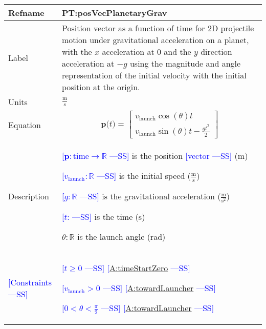 \documentclass[12pt]{article}
\newcommand{\authornote}[3]{\textcolor{#1}{[#3 ---#2]}}
\newcommand{\authornote}[3]{}
\newcommand{\wss}[1]{\authornote{blue}{SS}{#1}}
\begin{document}
\noindent \begin{minipage}{\textwidth}
\begin{tabular}{>{\raggedright}p{}>{\raggedright\arraybackslash}p{}}
\toprule \textbf{Refname} & \textbf{PT:posVecPlanetaryGrav} 
\label{PT:posVecPlanetaryGrav} \\ \midrule Label & Position vector as a function
of time for 2D projectile motion under gravitational acceleration on a planet,
with the $x$ acceleration at 0 and the $y$ direction acceleration at $-g$ using
the magnitude and angle representation of the initial velocity with the initial
position at the origin.
        
\\ \midrule
Units & $\frac{\text{m}}{\text{s}}$
        
\\ \midrule
Equation & \begin{displaymath}
           \symbf{p}\text{(}t\text{)}=\begin{bmatrix}
                                      {v}_{\text{launch}} \cos(\theta) t \\
                                      {v}_{\text{launch}} \sin(\theta) t - \frac{g t^2}{2}
                                      \end{bmatrix}
           \end{displaymath}
\\ \midrule
Description & \begin{symbDescription}
              \item{\wss{$\symbf{p}: \text{time} \rightarrow \mathbb{R}$} is the position \wss{vector} (${\text{m}}$)}
              \item{\wss{${{v}_{\text{launch}}}: \mathbb{R}$} is the initial speed ($\frac{\text{m}}{\text{s}}$)}
              \item{\wss{$g: \mathbb{R}$} is the gravitational acceleration ($\frac{\text{m}}{\text{s}^{2}}$)}
              \item{\wss{$t$: \text{time}} is the time (${\text{s}}$)}
              \item $\theta: \mathbb{R}$ is the launch angle (rad)
              \end{symbDescription}

\\ \midrule
\wss{Constraints} & 
\begin{symbDescription}
\item \wss{$t \geq 0$} \wss{\hyperref[timeStartZero]{A:timeStartZero}}
\item \wss{$v_\text{launch} > 0$} \wss{\hyperref[towardLauncher]{A:towardLauncher}}
\item \wss{$
0 < \theta < \frac{\pi}{2}$} \wss{\hyperref[towardLauncher]{A:towardLauncher}}
\end{symbDescription}


\end{tabular}
\end{minipage}
\end{document}
